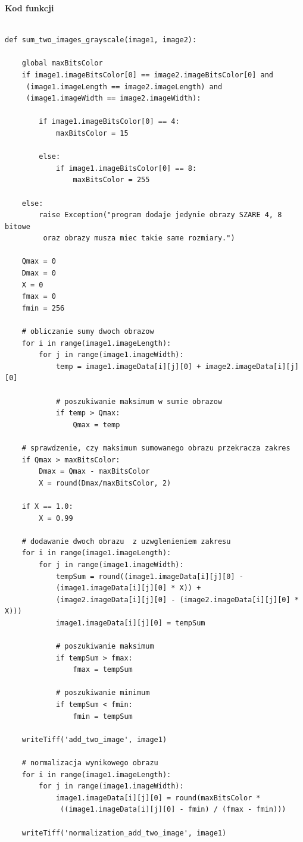 \documentclass[magisterska,openany]{pracadypl}
\begin{document}
\newpage
\textbf{\Large Kod funkcji}
   
\lstset{language=Python}
\vspace{0.25cm}
\begin{lstlisting}[caption={Sumowanie dwóch obrazów szarych}]

def sum_two_images_grayscale(image1, image2):

    global maxBitsColor
    if image1.imageBitsColor[0] == image2.imageBitsColor[0] and
     (image1.imageLength == image2.imageLength) and 
     (image1.imageWidth == image2.imageWidth):

        if image1.imageBitsColor[0] == 4:
            maxBitsColor = 15

        else:
            if image1.imageBitsColor[0] == 8:
                maxBitsColor = 255

    else:
        raise Exception("program dodaje jedynie obrazy SZARE 4, 8 bitowe
         oraz obrazy musza miec takie same rozmiary.")

    Qmax = 0
    Dmax = 0
    X = 0
    fmax = 0
    fmin = 256

    # obliczanie sumy dwoch obrazow
    for i in range(image1.imageLength):
        for j in range(image1.imageWidth):
            temp = image1.imageData[i][j][0] + image2.imageData[i][j][0]

            # poszukiwanie maksimum w sumie obrazow
            if temp > Qmax:
                Qmax = temp

    # sprawdzenie, czy maksimum sumowanego obrazu przekracza zakres
    if Qmax > maxBitsColor:
        Dmax = Qmax - maxBitsColor
        X = round(Dmax/maxBitsColor, 2)

    if X == 1.0:
        X = 0.99

    # dodawanie dwoch obrazu  z uzwglenieniem zakresu
    for i in range(image1.imageLength):
        for j in range(image1.imageWidth):
            tempSum = round((image1.imageData[i][j][0] - 
            (image1.imageData[i][j][0] * X)) + 
            (image2.imageData[i][j][0] - (image2.imageData[i][j][0] * X)))
            image1.imageData[i][j][0] = tempSum

            # poszukiwanie maksimum
            if tempSum > fmax:
                fmax = tempSum

            # poszukiwanie minimum
            if tempSum < fmin:
                fmin = tempSum

    writeTiff('add_two_image', image1)

    # normalizacja wynikowego obrazu
    for i in range(image1.imageLength):
        for j in range(image1.imageWidth):
            image1.imageData[i][j][0] = round(maxBitsColor *
             ((image1.imageData[i][j][0] - fmin) / (fmax - fmin)))
             
    writeTiff('normalization_add_two_image', image1)

\end{lstlisting}
\end{document}
